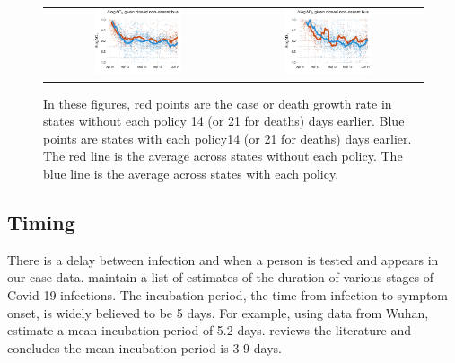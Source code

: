 \documentclass[11pt,reqno,letter]{amsart}
\theoremstyle{definition}
\begin{document}
\begin{figure}
\begin{minipage}{\linewidth}
\begin{tabular}{cc}
      \\
      \includegraphics[width=0.483\textwidth]{tables_and_figures/pnonessential-cases-14}
      &
        \includegraphics[width=0.483\textwidth]{tables_and_figures/pnonessential-deaths-21}
    \end{tabular}
  \end{minipage}
     \begin{flushleft}
      \footnotesize  In these figures, red points are the case or death
      growth rate in states without each policy 14 (or 21 for deaths)
      days earlier.  Blue points are states with each policy14 (or 21
      for deaths) days earlier.  The red line is the average across
      states without each policy. The blue line is the average across
      states with each policy.    \end{flushleft}
\end{figure}

\subsection{Timing\label{sec:timing}}

There is a delay between infection and when a person is tested and
appears in our case data. \cite{midas2020} maintain a list of
estimates of the duration of various stages of Covid-19
infections. The incubation period, the time from infection to symptom
onset, is widely believed to be 5 days. For example, using data from
Wuhan, \cite{li2020} estimate a mean incubation period of 5.2 days.
\cite{siorda2020} reviews the literature and concludes the mean
incubation period is 3-9 days.
\end{document}
